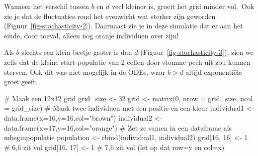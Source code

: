 \documentclass[
  a4paper,
]{scrbook}
\newenvironment{Shaded}{\begin{snugshade}}{\end{snugshade}}
\newcommand{\AttributeTok}[1]{\textcolor[rgb]{0.40,0.45,0.13}{#1}}
\newcommand{\CommentTok}[1]{\textcolor[rgb]{0.37,0.37,0.37}{#1}}
\newcommand{\DecValTok}[1]{\textcolor[rgb]{0.68,0.00,0.00}{#1}}
\newcommand{\FunctionTok}[1]{\textcolor[rgb]{0.28,0.35,0.67}{#1}}
\newcommand{\NormalTok}[1]{\textcolor[rgb]{0.00,0.23,0.31}{#1}}
\newcommand{\OtherTok}[1]{\textcolor[rgb]{0.00,0.23,0.31}{#1}}
\newcommand{\StringTok}[1]{\textcolor[rgb]{0.13,0.47,0.30}{#1}}
\theoremstyle{definition}
\theoremstyle{remark}
\begin{document}
Wanneer het verschil tussen \(b\) en \(d\) veel kleiner is, groeit het
grid minder vol.~Ook zie je dat de fluctuaties rond het evenwicht wat
sterker zijn geworden (Figuur~\ref{fig-stochasticity-2}). Daarnaast zie
je in deze simulatie dat er aan het einde, door toeval, alleen nog
oranje individuen over zijn!

Als \(b\) slechts een klein beetje groter is dan \(d\)
(Figuur~\ref{fig-stochasticity-3}), zien we zelfs dat de kleine
start-populatie van 2 cellen door stomme pech uit zou kunnen sterven.
Ook dit was niet mogelijk in de ODEs, waar \(b>d\) altijd exponentiële
groei geeft.

\begin{Shaded}
\begin{Highlighting}[]
\CommentTok{\# Maak een 12x12 grid}
\NormalTok{grid\_size }\OtherTok{\textless{}{-}} \DecValTok{32}
\NormalTok{grid }\OtherTok{\textless{}{-}} \FunctionTok{matrix}\NormalTok{(}\DecValTok{0}\NormalTok{, }\AttributeTok{nrow =}\NormalTok{ grid\_size, }\AttributeTok{ncol =}\NormalTok{ grid\_size)}
\CommentTok{\# Maak twee individuen met een positie en een kleur}
\NormalTok{individual1 }\OtherTok{\textless{}{-}} \FunctionTok{data.frame}\NormalTok{(}\AttributeTok{x=}\DecValTok{16}\NormalTok{,}\AttributeTok{y=}\DecValTok{16}\NormalTok{,}\AttributeTok{col=}\StringTok{"brown"}\NormalTok{)}
\NormalTok{individual2 }\OtherTok{\textless{}{-}} \FunctionTok{data.frame}\NormalTok{(}\AttributeTok{x=}\DecValTok{17}\NormalTok{,}\AttributeTok{y=}\DecValTok{16}\NormalTok{,}\AttributeTok{col=}\StringTok{"orange"}\NormalTok{)}
\CommentTok{\# Zet ze samen in een dataframe als \textquotesingle{}mbeginpopulatie\textquotesingle{}}
\NormalTok{population }\OtherTok{\textless{}{-}} \FunctionTok{rbind}\NormalTok{(individual1, individual2)}
\NormalTok{grid[}\DecValTok{16}\NormalTok{, }\DecValTok{16}\NormalTok{] }\OtherTok{\textless{}{-}} \DecValTok{1} \CommentTok{\# 6,6 zit vol}
\NormalTok{grid[}\DecValTok{16}\NormalTok{, }\DecValTok{17}\NormalTok{] }\OtherTok{\textless{}{-}} \DecValTok{1} \CommentTok{\# 7,6 zit vol (let op dat row=y en col=x)}


\end{Highlighting}
\end{Shaded}
\end{document}
